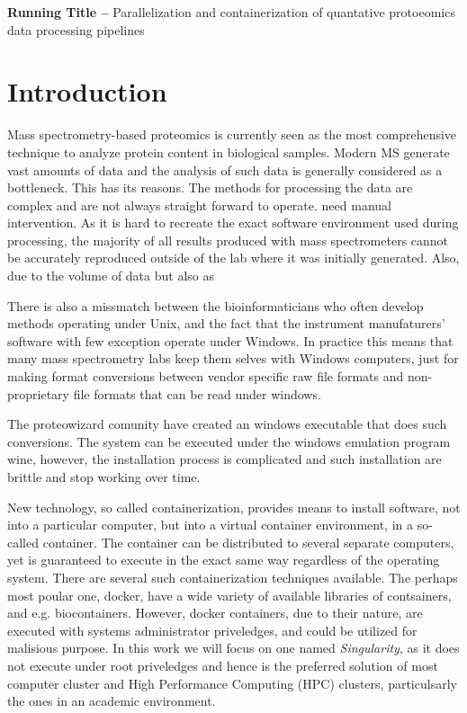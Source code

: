 \documentclass[11pt]{article}
\begin{document}
\maketitle

{ {\bf Running Title -- } Parallelization and containerization of quantative protoeomics data processing pipelines}

\begin{abstract}


\end{abstract}

\section*{Introduction}

Mass spectrometry-based proteomics is currently seen as the most comprehensive technique to analyze protein content in biological samples. Modern MS generate vast amounts of data and the analysis of such data is generally considered as a bottleneck. This has its reasons. The methods for processing the data are complex and are not always straight forward to operate. need manual intervention. As it is hard to recreate the exact software environment used during processing, the majority of all results produced with mass spectrometers cannot be accurately reproduced outside of the lab where it was initially generated. Also, due to the volume of data but also as

There is also a missmatch between the bioinformaticians who often develop methods operating under Unix, and the fact that the instrument manufaturers' software with few exception operate under Windows. In practice this means that many mass spectrometry labs keep them selves with Windows computers, just for making format conversions between vendor specific raw file formats and non-proprietary file formats that can be read under windows.

The proteowizard comunity have created an windows executable that does such conversions. The system can be executed under the windows emulation program wine, however, the installation process is complicated and such installation are brittle and stop working over time.

New technology, so called containerization, provides means to install software, not into a particular computer, but into a virtual container environment, in a so-called container. The container can be distributed to several separate computers, yet is guaranteed to execute in the exact same way regardless of the operating system. There are several such containerization techniques available. The perhaps most poular one, docker, have a wide variety of available libraries of contsainers, and e.g. biocontainers\cite{}. However, docker containers, due to their nature, are executed with systems administrator priveledges, and could be utilized for malisious purpose.  In this work we will focus on one named \textit{Singularity}, as it does not execute under root priveledges and hence is the preferred solution of most computer cluster and High Performance Computing (HPC) clusters, particulsarly the ones in an academic environment.
\end{document}
